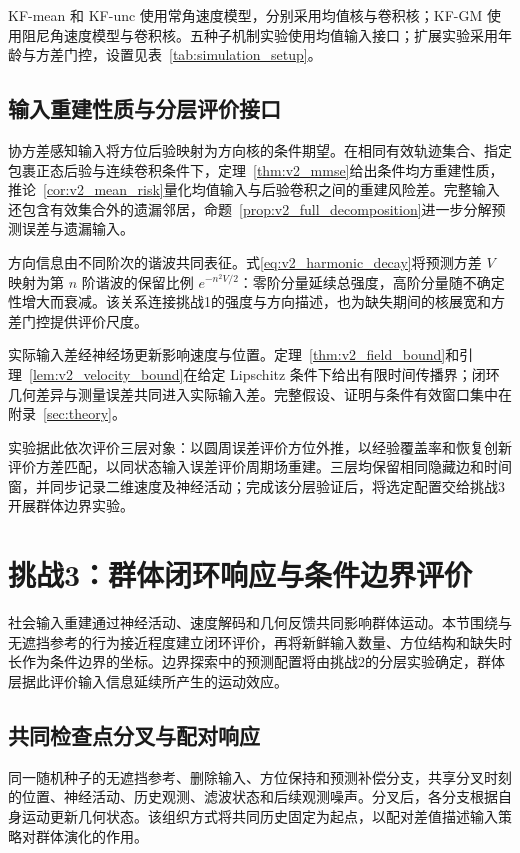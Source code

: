 \documentclass[UTF8,fontset=windows,11pt]{ctexart}
\begin{document}
KF-mean 和 KF-unc 使用常角速度模型，分别采用均值核与卷积核；KF-GM 使用阻尼角速度模型与卷积核。五种子机制实验使用均值输入接口；扩展实验采用年龄与方差门控，设置见表~\ref{tab:simulation_setup}。


\subsection{输入重建性质与分层评价接口}\label{sec:prediction_properties}
协方差感知输入将方位后验映射为方向核的条件期望。在相同有效轨迹集合、指定包裹正态后验与连续卷积条件下，定理~\ref{thm:v2_mmse}给出条件均方重建性质，推论~\ref{cor:v2_mean_risk}量化均值输入与后验卷积之间的重建风险差。完整输入还包含有效集合外的遗漏邻居，命题~\ref{prop:v2_full_decomposition}进一步分解预测误差与遗漏输入。

方向信息由不同阶次的谐波共同表征。式\eqref{eq:v2_harmonic_decay}将预测方差 $V$ 映射为第 $n$ 阶谐波的保留比例 $e^{-n^2V/2}$：零阶分量延续总强度，高阶分量随不确定性增大而衰减。该关系连接挑战1的强度与方向描述，也为缺失期间的核展宽和方差门控提供评价尺度。

实际输入差经神经场更新影响速度与位置。定理~\ref{thm:v2_field_bound}和引理~\ref{lem:v2_velocity_bound}在给定 Lipschitz 条件下给出有限时间传播界；闭环几何差异与测量误差共同进入实际输入差。完整假设、证明与条件有效窗口集中在附录~\ref{sec:theory}。

实验据此依次评价三层对象：以圆周误差评价方位外推，以经验覆盖率和恢复创新评价方差匹配，以同状态输入误差评价周期场重建。三层均保留相同隐藏边和时间窗，并同步记录二维速度及神经活动；完成该分层验证后，将选定配置交给挑战3开展群体边界实验。

\section{挑战3：群体闭环响应与条件边界评价}\label{sec:group_method}

社会输入重建通过神经活动、速度解码和几何反馈共同影响群体运动。本节围绕与无遮挡参考的行为接近程度建立闭环评价，再将新鲜输入数量、方位结构和缺失时长作为条件边界的坐标。边界探索中的预测配置将由挑战2的分层实验确定，群体层据此评价输入信息延续所产生的运动效应。

\subsection{共同检查点分叉与配对响应}\label{sec:paired_response}
同一随机种子的无遮挡参考、删除输入、方位保持和预测补偿分支，共享分叉时刻的位置、神经活动、历史观测、滤波状态和后续观测噪声。分叉后，各分支根据自身运动更新几何状态。该组织方式将共同历史固定为起点，以配对差值描述输入策略对群体演化的作用。
\end{document}
